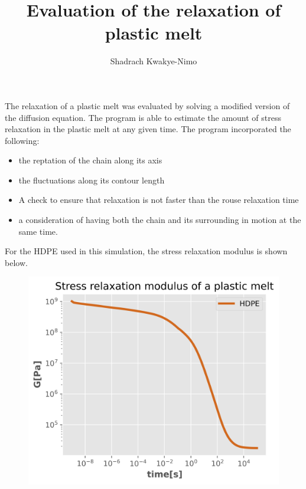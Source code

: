 \documentclass{beamer}
\author{Shadrach Kwakye-Nimo}
\title{Evaluation of the relaxation of plastic melt}
\begin{document}
\begin{frame}
\titlepage
\end{frame}


\begin{frame}
The relaxation of a plastic melt was evaluated by solving a modified version of the diffusion equation. The program is able to estimate the amount of stress relaxation in the plastic melt at any given time. The program incorporated the following:
\begin{itemize}

\item the reptation of the chain along its axis
\item the fluctuations along its contour length
\item A check to ensure that relaxation is not faster than the rouse relaxation time
\item a consideration of having both the chain and its surrounding in motion at the same time.
\end{itemize}
\end{frame}

\begin{frame}
For the HDPE used in this simulation, the stress relaxation modulus is shown below.
\begin{figure}
\includegraphics[scale=0.7]{figures/relaxation.png}
\end{figure}

\end{frame}
\end{document}
